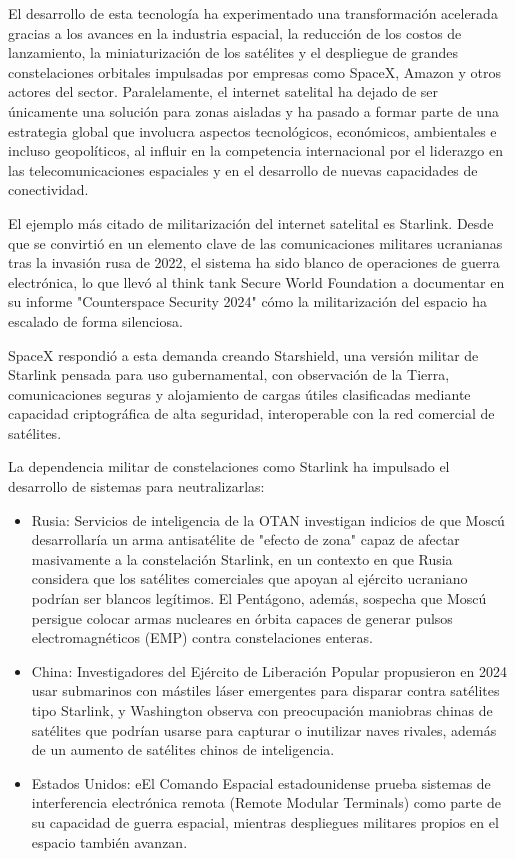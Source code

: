 El desarrollo de esta tecnología ha experimentado una transformación acelerada gracias a los avances en la industria espacial, la reducción de los costos de lanzamiento, la miniaturización de los satélites y el despliegue de grandes constelaciones orbitales impulsadas por empresas como SpaceX, Amazon y otros actores del sector. Paralelamente, el internet satelital ha dejado de ser únicamente una solución para zonas aisladas y ha pasado a formar parte de una estrategia global que involucra aspectos tecnológicos, económicos, ambientales e incluso geopolíticos, al influir en la competencia internacional por el liderazgo en las telecomunicaciones espaciales y en el desarrollo de nuevas capacidades de conectividad.

El ejemplo más citado de militarización del internet satelital es Starlink. Desde que se convirtió en un elemento clave de las comunicaciones militares ucranianas tras la invasión rusa de 2022, el sistema ha sido blanco de operaciones de guerra electrónica, lo que llevó al think tank Secure World Foundation a documentar en su informe "Counterspace Security 2024" cómo la militarización del espacio ha escalado de forma silenciosa.

SpaceX respondió a esta demanda creando Starshield, una versión militar de Starlink pensada para uso gubernamental, con observación de la Tierra, comunicaciones seguras y alojamiento de cargas útiles clasificadas mediante capacidad criptográfica de alta seguridad, interoperable con la red comercial de satélites.

La dependencia militar de constelaciones como Starlink ha impulsado el desarrollo de sistemas para neutralizarlas:

\begin{itemize}
    \item{Rusia}: Servicios de inteligencia de la OTAN investigan indicios de que Moscú desarrollaría un arma antisatélite de "efecto de zona" capaz de afectar masivamente a la constelación Starlink, en un contexto en que Rusia considera que los satélites comerciales que apoyan al ejército ucraniano podrían ser blancos legítimos. El Pentágono, además, sospecha que Moscú persigue colocar armas nucleares en órbita capaces de generar pulsos electromagnéticos (EMP) contra constelaciones enteras.

    \item{China}: Investigadores del Ejército de Liberación Popular propusieron en 2024 usar submarinos con mástiles láser emergentes para disparar contra satélites tipo Starlink, y Washington observa con preocupación maniobras chinas de satélites que podrían usarse para capturar o inutilizar naves rivales, además de un aumento de satélites chinos de inteligencia.

    \item{Estados Unidos}: eEl Comando Espacial estadounidense prueba sistemas de interferencia electrónica remota (Remote Modular Terminals) como parte de su capacidad de guerra espacial, mientras despliegues militares propios en el espacio también avanzan.
\end{itemize}

